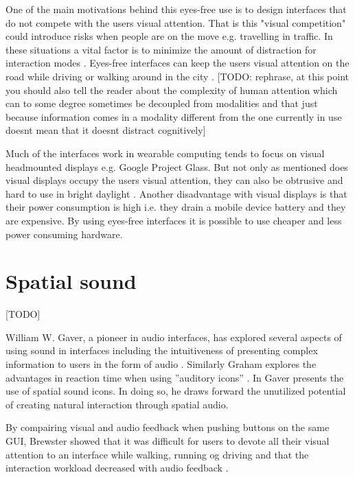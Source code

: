 One of the main motivations behind this eyes-free use is to design interfaces that do not compete with the users visual attention. That is this "visual competition" could introduce risks when people are on the move e.g. travelling in traffic. In these situations a vital factor is to minimize the amount of distraction for interaction modes \cite{pascoe_using_2000}. Eyes-free interfaces can keep the users visual attention on the road while driving \cite{sodnik_user_2008} or walking around in the city \cite{vazquez-alvarez_eyes-free_2011}. [TODO: rephrase, at this point you should also tell the reader about the complexity of human attention which can to some degree sometimes be decoupled from modalities and that just because information comes in a modality different from the one currently in use doesnt mean that it doesnt distract cognitively]

Much of the interfaces work in wearable computing tends to focus on visual headmounted displays \cite{barfield_fundamentals_2000} e.g. Google Project Glass. But not only as mentioned does visual displays occupy the users visual attention, they can also be obtrusive and hard to use in bright daylight \cite{geelhoed_safety_2000}. Another disadvantage with visual displays is that their power consumption is high i.e. they drain a mobile device battery and they are expensive. By using eyes-free interfaces it is possible to use cheaper and less power consuming hardware.


\section{Spatial sound}
[TODO]

William W. Gaver, a pioneer in audio interfaces, has explored several aspects of using sound in interfaces including the intuitiveness of presenting complex information to users in the form of audio \cite{gaver_sonicfinder:_1989}. Similarly Graham explores the advantages in reaction time when using ”auditory icons” \cite{graham_use_1999}. In \cite{gaver_auditory_1986} Gaver presents the use of spatial sound icons. In doing so, he draws forward the unutilized potential of creating natural interaction through spatial audio.

By compairing visual and audio feedback when pushing buttons on the same GUI, Brewster showed that it was difficult for users to devote all their visual attention to an interface while walking, running og driving and that the interaction workload decreased with audio feedback \cite{brewster_overcoming_2002}.

